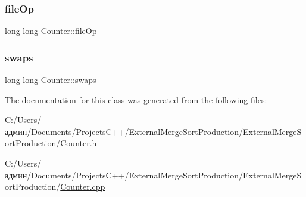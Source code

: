 \hypertarget{class_counter_abc197117fc99ab93bebc483059ae0fbc}{}\label{class_counter_abc197117fc99ab93bebc483059ae0fbc} 
\subsubsection{\texorpdfstring{file\+Op}{fileOp}}
{\footnotesize\ttfamily long long Counter\+::file\+Op\hspace{0.3cm}{\ttfamily [private]}}

\hypertarget{class_counter_a2a5ee961a25c6eb87d1ad02bcef4ade1}{}\label{class_counter_a2a5ee961a25c6eb87d1ad02bcef4ade1} 
\subsubsection{\texorpdfstring{swaps}{swaps}}
{\footnotesize\ttfamily long long Counter\+::swaps\hspace{0.3cm}{\ttfamily [private]}}



The documentation for this class was generated from the following files\+:\begin{DoxyCompactItemize}
\item 
C\+:/\+Users/админ/\+Documents/\+Projects\+C++/\+External\+Merge\+Sort\+Production/\+External\+Merge\+Sort\+Production/\hyperlink{_counter_8h}{Counter.\+h}\item 
C\+:/\+Users/админ/\+Documents/\+Projects\+C++/\+External\+Merge\+Sort\+Production/\+External\+Merge\+Sort\+Production/\hyperlink{_counter_8cpp}{Counter.\+cpp}\end{DoxyCompactItemize}
